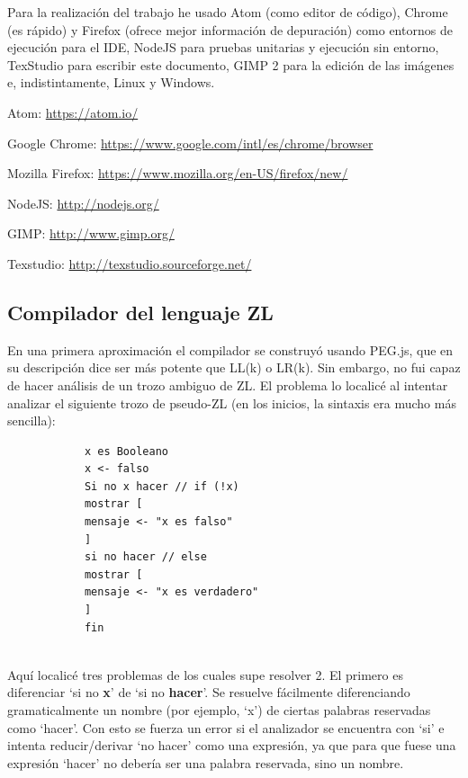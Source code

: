 \documentclass{report}
\begin{document}
	Para la realización del trabajo he usado Atom (como editor de código), Chrome (es rápido) y Firefox (ofrece mejor información de depuración) como entornos de ejecución para el IDE, NodeJS para pruebas unitarias y ejecución sin entorno, TexStudio para escribir este documento, GIMP 2 para la edición de las imágenes e, indistintamente, Linux y Windows.  
	
	\vspace{10px}
	Atom: \href{https://atom.io/}{https://atom.io/}
	
	Google Chrome: \href{https://www.google.com/intl/es/chrome/browser/?hl=es\&brand=CHMI}{https://www.google.com/intl/es/chrome/browser}
	
	Mozilla Firefox: \href{https://www.mozilla.org/en-US/firefox/new/}{https://www.mozilla.org/en-US/firefox/new/}
	
	NodeJS: \href{http://nodejs.org/}{http://nodejs.org/}
	
	GIMP: \href{http://www.gimp.org/}{http://www.gimp.org/}
	 
	Texstudio: \href{http://texstudio.sourceforge.net/}{http://texstudio.sourceforge.net/}
	
			\subsection{Compilador del lenguaje ZL}
			En una primera aproximación el compilador se construyó usando PEG.js\cite{pegjs}, que en su descripción dice ser más potente que LL(k) o LR(k). Sin embargo, no fui capaz de hacer análisis de un trozo ambiguo de ZL. El problema lo localicé al intentar analizar el siguiente trozo de pseudo-ZL (en los inicios, la sintaxis era mucho más sencilla):
			
			\begin{BVerbatim}
			x es Booleano
			x <- falso
			Si no x hacer // if (!x)
			mostrar [
			mensaje <- "x es falso"
			]
			si no hacer // else
			mostrar [
			mensaje <- "x es verdadero"
			]
			fin
			\end{BVerbatim}
			\\
			
			Aquí localicé tres problemas de los cuales supe resolver 2. El primero es diferenciar `si no \textbf{x}' de `si no \textbf{hacer}'. Se resuelve fácilmente diferenciando gramaticalmente un nombre (por ejemplo, `x') de ciertas palabras reservadas como `hacer'. Con esto se fuerza un error si el analizador se encuentra con `si' e intenta reducir/derivar `no hacer' como una expresión, ya que para que fuese una expresión `hacer' no debería ser una palabra reservada, sino un nombre.
			
\end{document}

